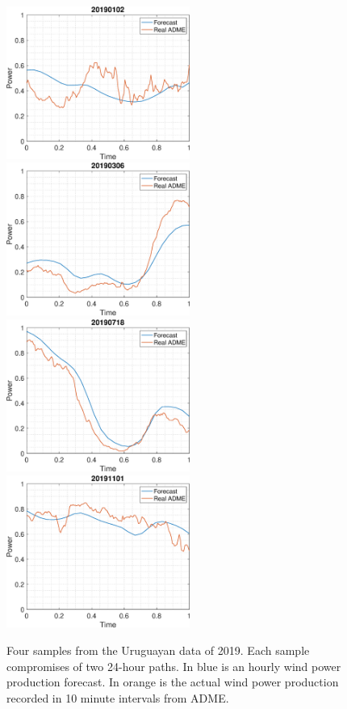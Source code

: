 \documentclass[11pt]{article}
\begin{document}
\begin{figure}
  \includegraphics[width=60mm,scale=1]{plots/5.eps}
  \includegraphics[width=60mm,scale=1]{plots/245.eps}\\
   \includegraphics[width=60mm,scale=1]{plots/661.eps}
  \includegraphics[width=60mm,scale=1]{plots/805.eps}
  \caption{Four samples from the Uruguayan data of 2019. Each sample compromises of two 24-hour paths. In blue is an hourly wind power production forecast. In orange is the actual wind power production recorded in 10 minute intervals from  ADME.}
  \label{fig:sample_data}
\end{figure}
\end{document}
